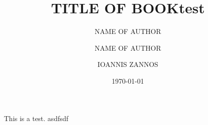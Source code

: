\documentclass[10pt,twoside,openright]{memoir}
\author{NAME OF AUTHOR}
\author{NAME OF AUTHOR}
\title{TITLE OF BOOK}
\date{}
\author{IOANNIS ZANNOS}
\date{\today}
\title{test}
\makeatletter
\def\maketitle{%
  \null
  \thispagestyle{empty}%
  \vfill
  \begin{center}\leavevmode
    \normalfont
    {\LARGE\raggedleft \@author\par}%
    \hrulefill\par
    {\huge\raggedright \@title\par}%
    \vskip 1cm
  \end{center}%
  \vfill
  \null
  \cleardoublepage
  }
\makeatother
\begin{document}
\maketitle
\tableofcontents

This is a test.
 asdfsdf
\end{document}
